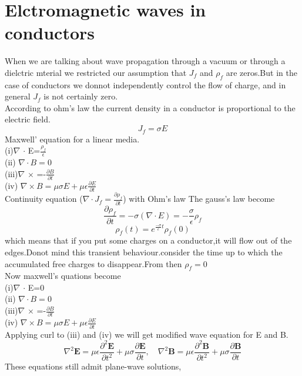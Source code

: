 \section{Elctromagnetic waves in conductors}
When we are talking about wave propagation through a vacuum or through a dielctric mterial we restricted our assumption that $J_f$ and $\rho_f$ are zeros.But in the case of conductors we donnot independently control the flow of charge, and in general $J_f$ is not certainly zero.\\
According to ohm's law the current density in a conductor is proportional to the electric field.\\
$$J_f=\sigma E$$
Maxwell' equation for a linear media.\\
(i)\quad $\nabla$ $\cdot$ E=$\frac{\rho_f}{\epsilon}$\\
(ii) \quad $\nabla \cdot B=0$\\
(iii)\quad $\nabla$ $\times$ =-$\frac{\partial B}{\partial t}$\\
(iv) \quad $\nabla \times B=\mu \sigma E+\mu \epsilon \frac{\partial E}{\partial t}$\\
Continuity equation ($\nabla \cdot J_f=\frac{\partial \rho_f}{\partial t}$) with Ohm's law The gauss's law become\\
$$\frac{\partial \rho_f}{\partial t}=-\sigma (\nabla \cdot E)=-\frac{\sigma}{\epsilon}\rho_f$$
$$\rho_f(t)=e^{\frac{-\sigma}{\epsilon}t} \rho_f(0)$$
which means that if you put some charges on a conductor,it will flow out of the edges.Donot mind this transient behaviour.consider the time up to which the accumulated free charges to disappear.From then $\rho_f=0$\\
Now maxwell's quations become\\
(i)\quad $\nabla$ $\cdot$ E=0\\
(ii) \quad $\nabla \cdot B=0$\\
(iii)\quad $\nabla$ $\times$ =-$\frac{\partial B}{\partial t}$\\
(iv) \quad $\nabla \times B=\mu \sigma E+\mu \epsilon \frac{\partial E}{\partial t}$\\
Applying curl to (iii) and (iv) we will get modified wave equation for E and B.\\
$$\nabla^{2} \mathbf{E}=\mu \epsilon \frac{\partial^{2} \mathbf{E}}{\partial t^{2}}+\mu \sigma \frac{\partial \mathbf{E}}{\partial t}, \quad \nabla^{2} \mathbf{B}=\mu \epsilon \frac{\partial^{2} \mathbf{B}}{\partial t^{2}}+\mu \sigma \frac{\partial \mathbf{B}}{\partial t}$$
These equations still admit plane-wave solutions,
